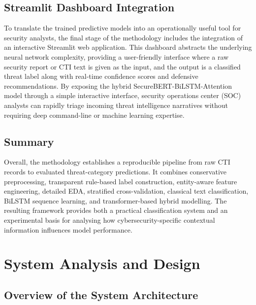 \documentclass[12pt,a4paper]{report}
\begin{document}
\section{Streamlit Dashboard
Integration}\label{streamlit-dashboard-integration}

To translate the trained predictive models into an operationally useful
tool for security analysts, the final stage of the methodology includes
the integration of an interactive Streamlit web application. This
dashboard abstracts the underlying neural network complexity, providing
a user-friendly interface where a raw security report or CTI text is
given as the input, and the output is a classified threat label along
with real-time confidence scores and defensive recommendations. By
exposing the hybrid SecureBERT-BiLSTM-Attention model through a simple
interactive interface, security operations center (SOC) analysts can
rapidly triage incoming threat intelligence narratives without requiring
deep command-line or machine learning expertise.
\section{Summary}\label{summary}

Overall, the methodology establishes a reproducible pipeline from raw
CTI records to evaluated threat-category predictions. It combines
conservative preprocessing, transparent rule-based label construction,
entity-aware feature engineering, detailed EDA, stratified
cross-validation, classical text classification, BiLSTM sequence
learning, and transformer-based hybrid modelling. The resulting
framework provides both a practical classification system and an
experimental basis for analysing how cybersecurity-specific contextual
information influences model performance.

\chapter{System Analysis and Design}
\section{Overview of the System
Architecture}\label{overview-of-the-system-architecture}
\end{document}
